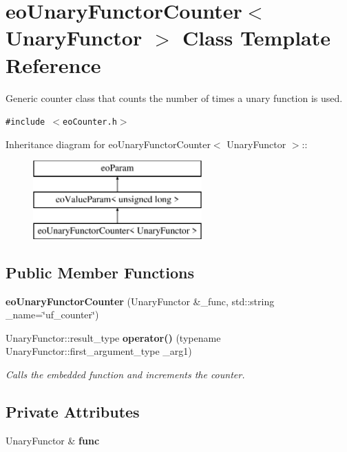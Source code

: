 \section{eo\-Unary\-Functor\-Counter$<$ Unary\-Functor $>$ Class Template Reference}
\label{classeo_unary_functor_counter}
Generic counter class that counts the number of times a unary function is used.  


{\tt \#include $<$eo\-Counter.h$>$}

Inheritance diagram for eo\-Unary\-Functor\-Counter$<$ Unary\-Functor $>$::\begin{figure}[H]
\begin{center}
\leavevmode
\includegraphics[height=3cm]{classeo_unary_functor_counter}
\end{center}
\end{figure}
\subsection*{Public Member Functions}
\begin{CompactItemize}
\item 
{\bf eo\-Unary\-Functor\-Counter} (Unary\-Functor \&\_\-func, std::string \_\-name=\char`\"{}uf\_\-counter\char`\"{})\label{classeo_unary_functor_counter_a0}

\item 
Unary\-Functor::result\_\-type {\bf operator()} (typename Unary\-Functor::first\_\-argument\_\-type \_\-arg1)
\begin{CompactList}\small\item\em Calls the embedded function and increments the counter. \item\end{CompactList}\end{CompactItemize}
\subsection*{Private Attributes}
\begin{CompactItemize}
\item 
Unary\-Functor \& {\bf func}\label{classeo_unary_functor_counter_r0}

\end{CompactItemize}


